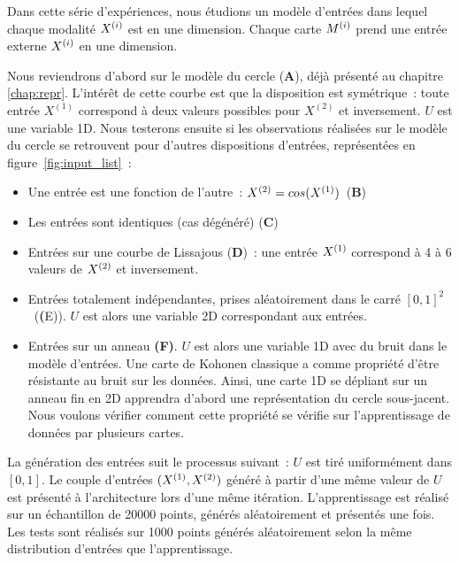 \documentclass[../main]{subfiles}
\begin{document}
Dans cette série d'expériences, nous étudions un modèle d'entrées dans lequel chaque modalité $X^{({i})}$ est en une dimension. Chaque carte $M^{({i})}$ prend une entrée externe $X^{({i})}$ en une dimension.

Nous reviendrons d'abord sur le modèle du cercle (\textbf{A}), déjà présenté au chapitre \ref{chap:repr}. L'intérêt de cette courbe est que la disposition est symétrique~: toute entrée $X^{(1)}$ correspond à deux valeurs possibles pour $X^{(2)}$ et inversement. $U$ est une variable 1D.
Nous testerons ensuite si les observations réalisées sur le modèle du cercle se retrouvent pour d'autres dispositions d'entrées, représentées en figure~\ref{fig:input_list}~:
\begin{itemize}
	\item Une entrée est une fonction de l'autre~: $X^{({2})} = cos(X^{({1})})$~(\textbf{B})
	\item Les entrées sont identiques (cas dégénéré) (\textbf{C})
	\item Entrées sur une courbe de Lissajous (\textbf{D})~: une entrée $X^{({1})}$ correspond à 4 à 6 valeurs de $X^{({2})}$ et inversement.
	\item Entrées totalement indépendantes, prises aléatoirement dans le carré $[0,1]^2$~(\textbf({E})). $U$ est alors une variable 2D correspondant aux entrées.
	\item Entrées sur un anneau \textbf{(F)}. $U$ est alors une variable 1D avec du bruit dans le modèle d'entrées. Une carte de Kohonen classique a comme propriété d'être résistante au bruit sur les données. Ainsi, une carte 1D se dépliant sur un anneau fin en 2D apprendra d'abord une représentation du cercle sous-jacent. Nous voulons vérifier comment cette propriété se vérifie sur l'apprentissage de données par plusieurs cartes.
\end{itemize}



La génération des entrées suit le processus suivant~: $U$ est tiré uniformément dans $[0,1]$. Le couple d'entrées $(X^{({1})},X^{({2})})$ généré à partir d'une même valeur de $U$ est présenté à l'architecture lors d'une même itération.
L'apprentissage est réalisé sur un échantillon de 20000 points, générés aléatoirement et présentés une fois. 
Les tests sont réalisés sur 1000 points générés aléatoirement selon la même distribution d'entrées que l'apprentissage.



\end{document}
